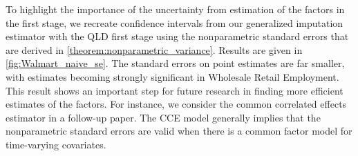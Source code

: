 \documentclass[12pt]{article}
\begin{document}
% 
% 
% 

To highlight the importance of the uncertainty from estimation of the factors in the first stage, we recreate confidence intervals from our generalized imputation estimator with the QLD first stage using the nonparametric standard errors that are derived in \autoref{theorem:nonparametric_variance}. Results are given in \autoref{fig:Walmart_naive_se}. The standard errors on point estimates are far smaller, with estimates becoming strongly significant in Wholesale Retail Employment. This result shows an important step for future research in finding more efficient estimates of the factors. For instance, we consider the common correlated effects estimator in a follow-up paper. The CCE model generally implies that the nonparametric standard errors are valid when there is a common factor model for time-varying covariates.
\end{document}
